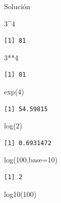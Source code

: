 \documentclass[
  ignorenonframetext,
  aspectratio=169,
  spanish,
]{beamer}
\newenvironment{Shaded}{\begin{snugshade}}{\end{snugshade}}
\newcommand{\AttributeTok}[1]{\textcolor[rgb]{0.40,0.45,0.13}{#1}}
\newcommand{\DecValTok}[1]{\textcolor[rgb]{0.68,0.00,0.00}{#1}}
\newcommand{\FunctionTok}[1]{\textcolor[rgb]{0.28,0.35,0.67}{#1}}
\newcommand{\NormalTok}[1]{\textcolor[rgb]{0.00,0.23,0.31}{#1}}
\newcommand{\SpecialCharTok}[1]{\textcolor[rgb]{0.37,0.37,0.37}{#1}}
\begin{document}
\begin{frame}[fragile]{Solución}
\label{soluciuxf3n}
\begin{Shaded}
\begin{Highlighting}[]
\DecValTok{3}\SpecialCharTok{\^{}}\DecValTok{4}
\end{Highlighting}
\end{Shaded}

\begin{verbatim}
[1] 81
\end{verbatim}

\begin{Shaded}
\begin{Highlighting}[]
\DecValTok{3}\SpecialCharTok{**}\DecValTok{4}
\end{Highlighting}
\end{Shaded}

\begin{verbatim}
[1] 81
\end{verbatim}

\begin{Shaded}
\begin{Highlighting}[]
\FunctionTok{exp}\NormalTok{(}\DecValTok{4}\NormalTok{)}
\end{Highlighting}
\end{Shaded}

\begin{verbatim}
[1] 54.59815
\end{verbatim}

\begin{Shaded}
\begin{Highlighting}[]
\FunctionTok{log}\NormalTok{(}\DecValTok{2}\NormalTok{)}
\end{Highlighting}
\end{Shaded}

\begin{verbatim}
[1] 0.6931472
\end{verbatim}

\begin{Shaded}
\begin{Highlighting}[]
\FunctionTok{log}\NormalTok{(}\DecValTok{100}\NormalTok{,}\AttributeTok{base=}\DecValTok{10}\NormalTok{)}
\end{Highlighting}
\end{Shaded}

\begin{verbatim}
[1] 2
\end{verbatim}

\begin{Shaded}
\begin{Highlighting}[]
\FunctionTok{log10}\NormalTok{(}\DecValTok{100}\NormalTok{)}
\end{Highlighting}
\end{Shaded}


\end{frame}
\end{document}
